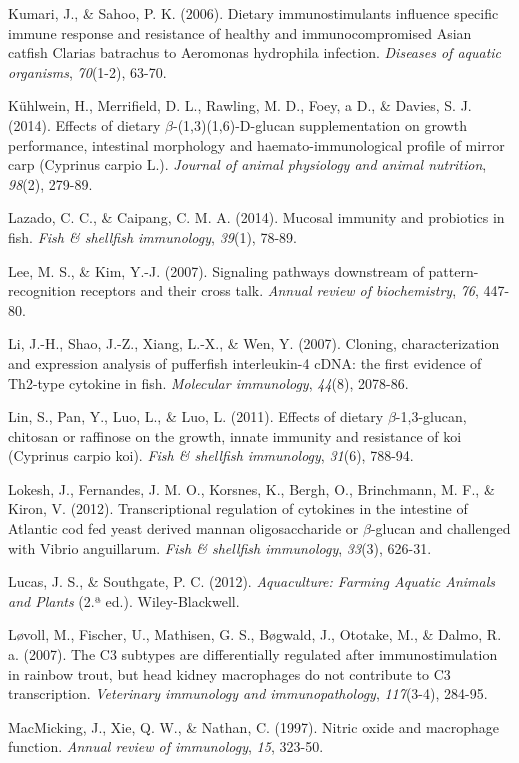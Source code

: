 \documentclass[12pt,letterpaper,oneside]{scrbook}
\begin{document}
Kumari, J., \& Sahoo, P. K. (2006). Dietary immunostimulants influence
specific immune response and resistance of healthy and immunocompromised
Asian catfish Clarias batrachus to Aeromonas hydrophila infection.
\emph{Diseases of aquatic organisms}, \emph{70}(1-2), 63-70.

Kühlwein, H., Merrifield, D. L., Rawling, M. D., Foey, a D., \& Davies,
S. J. (2014). Effects of dietary \(\beta\)-(1,3)(1,6)-D-glucan
supplementation on growth performance, intestinal morphology and
haemato-immunological profile of mirror carp (Cyprinus carpio L.).
\emph{Journal of animal physiology and animal nutrition}, \emph{98}(2),
279-89.

Lazado, C. C., \& Caipang, C. M. A. (2014). Mucosal immunity and
probiotics in fish. \emph{Fish \& shellfish immunology}, \emph{39}(1),
78-89.

Lee, M. S., \& Kim, Y.-J. (2007). Signaling pathways downstream of
pattern-recognition receptors and their cross talk. \emph{Annual review
of biochemistry}, \emph{76}, 447-80.

Li, J.-H., Shao, J.-Z., Xiang, L.-X., \& Wen, Y. (2007). Cloning,
characterization and expression analysis of pufferfish interleukin-4
cDNA: the first evidence of Th2-type cytokine in fish. \emph{Molecular
immunology}, \emph{44}(8), 2078-86.

Lin, S., Pan, Y., Luo, L., \& Luo, L. (2011). Effects of dietary
\(\beta\)-1,3-glucan, chitosan or raffinose on the growth, innate
immunity and resistance of koi (Cyprinus carpio koi). \emph{Fish \&
shellfish immunology}, \emph{31}(6), 788-94.

Lokesh, J., Fernandes, J. M. O., Korsnes, K., Bergh, O., Brinchmann, M.
F., \& Kiron, V. (2012). Transcriptional regulation of cytokines in the
intestine of Atlantic cod fed yeast derived mannan oligosaccharide or
\(\beta\)-glucan and challenged with Vibrio anguillarum. \emph{Fish \&
shellfish immunology}, \emph{33}(3), 626-31.

Lucas, J. S., \& Southgate, P. C. (2012). \emph{Aquaculture: Farming
Aquatic Animals and Plants} (2.ª ed.). Wiley-Blackwell.

Løvoll, M., Fischer, U., Mathisen, G. S., Bøgwald, J., Ototake, M., \&
Dalmo, R. a. (2007). The C3 subtypes are differentially regulated after
immunostimulation in rainbow trout, but head kidney macrophages do not
contribute to C3 transcription. \emph{Veterinary immunology and
immunopathology}, \emph{117}(3-4), 284-95.

MacMicking, J., Xie, Q. W., \& Nathan, C. (1997). Nitric oxide and
macrophage function. \emph{Annual review of immunology}, \emph{15},
323-50.
\end{document}
